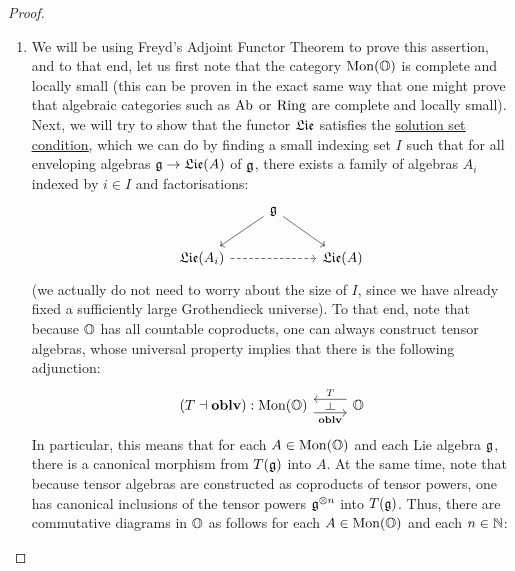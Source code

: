                 \begin{proof}
                    \noindent
                    \begin{enumerate}
                        \item We will be using Freyd's Adjoint Functor Theorem \cite[Theorem V.6.2]{maclane} to prove this assertion, and to that end, let us first note that the category $\mathrm{Mon}(\mathbb{O})$ is complete and locally small (this can be proven in the exact same way that one might prove that algebraic categories such as $\mathrm{Ab}$ or $\mathrm{Ring}$ are complete and locally small). Next, we will try to show that the functor $\mathfrak{Lie}$ satisfies the \href{https://ncatlab.org/nlab/show/solution+set+condition}{\underline{solution set condition}}, which we can do by finding a small indexing set $I$ such that for all enveloping algebras $\mathfrak{g} \to \mathfrak{Lie}(A)$ of $\mathfrak{g}$, there exists a family of algebras $A_i$ indexed by $i \in I$ and factorisations:
                            $$
                                \begin{tikzcd}
                                	& {\g} \\
                                	{\frakLie(A_i)} && {\frakLie(A)}
                                	\arrow[from=2-1, to=2-3, dashed]
                                	\arrow["{}"', from=1-2, to=2-1]
                                	\arrow["{}", from=1-2, to=2-3]
                                \end{tikzcd}
                            $$
                        (we actually do not need to worry about the size of $I$, since we have already fixed a sufficiently large Grothendieck universe). To that end, note that because $\mathbb{O}$ has all countable coproducts, one can always construct tensor algebras, whose universal property implies that there is the following adjunction:
                            $$
                                \begin{tikzcd}
                                	{(T \ladjoint \oblv): \Mon(\O)} & {\O}
                                	\arrow["{\oblv}"{name=0, swap}, from=1-1, to=1-2, shift right=2]
                                	\arrow["{T}"{name=1, swap}, from=1-2, to=1-1, shift right=2]
                                	\arrow["\dashv"{rotate=-90}, from=1, to=0, phantom]
                                \end{tikzcd}
                            $$
                        In particular, this means that for each $A \in \mathrm{Mon}(\mathbb{O})$ and each Lie algebra $\mathfrak{g}$, there is a canonical morphism from $T(\mathfrak{g})$ into $A$. At the same time, note that because tensor algebras are constructed as coproducts of tensor powers, one has canonical inclusions of the tensor powers $\g^{\tensor n}$ into $T(\mathfrak{g})$. Thus, there are commutative diagrams in $\mathbb{O}$ as follows for each $A \in \mathrm{Mon}(\mathbb{O})$ and each $n \in \mathbb{N}$:

\end{enumerate}
\end{proof}
